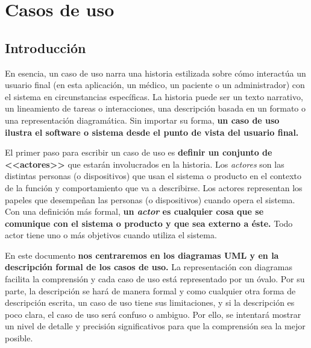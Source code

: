 	
\section{Casos de uso} %
	\label{cha:casos_de_uso}

% 
%
\subsection{Introducción} %
	\label{sec:modelo_casos_de_uso}
	
		En esencia, un caso de uso narra una historia estilizada sobre cómo interactúa un usuario final (en esta aplicación, un médico, un paciente o un administrador) con el sistema en circunstancias específicas. La historia puede ser un texto narrativo, un lineamiento de tareas o interacciones, una descripción basada en un formato o una representación diagramática. Sin importar su forma, \textbf{un caso de uso ilustra el software o sistema desde el punto de vista del usuario final.}
		
		\medskip
		
		\medskip		
		El primer paso para escribir un caso de uso es \textbf{definir un conjunto de <<actores>>} que estarán involucrados en la historia. Los \textit{actores} son las distintas personas (o dispositivos) que usan el sistema o producto en el contexto de la función y comportamiento que va a describirse. Los actores representan los papeles que desempeñan las personas (o dispositivos) cuando opera el sistema. Con una definición más formal, \textbf{un \textit{actor} es cualquier cosa que se comunique con el sistema o producto y que sea externo a éste.} Todo actor tiene uno o más objetivos cuando utiliza el sistema.
		
		 En este documento \textbf{nos centraremos en los diagramas UML y en la descripción formal de los casos de uso.} La representación con diagramas facilita la comprensión y cada caso de uso está representado por un óvalo. Por su parte, la descripción se hará de manera formal y como cualquier otra forma de descripción escrita, un caso de uso tiene sus limitaciones, y si la descripción es poco clara, el caso de uso será confuso o ambiguo. Por ello, se intentará mostrar un nivel de detalle y precisión significativos para que la comprensión sea la mejor posible.
		

